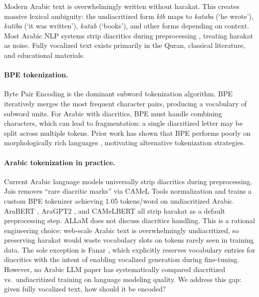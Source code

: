\documentclass[11pt]{article}
\begin{document}
Modern Arabic text is overwhelmingly written without harakat.
This creates massive lexical ambiguity: the undiacritized form \emph{ktb} maps to \emph{kataba} (`he wrote'), \emph{kutiba} (`it was written'), \emph{kutub} (`books'), and other forms depending on context.
Most Arabic NLP systems strip diacritics during preprocessing \cite{darwish2021panoramic}, treating harakat as noise.
Fully vocalized text exists primarily in the Quran, classical literature, and educational materials.

\paragraph{BPE tokenization.}
Byte Pair Encoding \cite{sennrich-etal-2016-neural} is the dominant subword tokenization algorithm.
BPE iteratively merges the most frequent character pairs, producing a vocabulary of subword units.
For Arabic with diacritics, BPE must handle combining characters, which can lead to fragmentation: a single diacritized letter may be split across multiple tokens.
Prior work has shown that BPE performs poorly on morphologically rich languages \cite{rust-etal-2021-good, mielke2021between}, motivating alternative tokenization strategies.

\paragraph{Arabic tokenization in practice.}
Current Arabic language models universally strip diacritics during preprocessing.
Jais \cite{sengupta2023jais} removes ``rare diacritic marks'' via CAMeL Tools normalization and trains a custom BPE tokenizer achieving 1.05 tokens/word on undiacritized Arabic.
AraBERT \cite{antoun2020arabert}, AraGPT2 \cite{antoun2021aragpt2}, and CAMeLBERT \cite{inoue2021camelbert} all strip harakat as a default preprocessing step.
ALLaM \cite{bari2024allam} does not discuss diacritics handling.
This is a rational engineering choice: web-scale Arabic text is overwhelmingly undiacritized, so preserving harakat would waste vocabulary slots on tokens rarely seen in training data.
The sole exception is Fanar \cite{fanar2025}, which explicitly reserves vocabulary entries for diacritics with the intent of enabling vocalized generation during fine-tuning.
However, no Arabic LLM paper has systematically compared diacritized vs.\ undiacritized training on language modeling quality.
We address this gap: given fully vocalized text, how should it be encoded?
\end{document}
